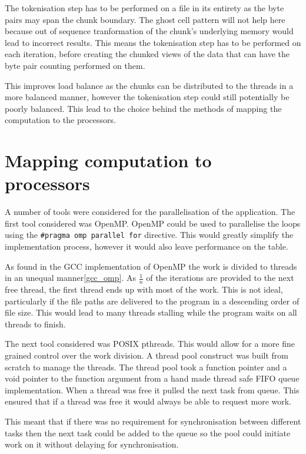 \documentclass{article}
\begin{document}
The tokenisation step has to be performed on a file in its entirety as the byte pairs may span the 
chunk boundary. The ghost cell pattern will not help here because out of sequence tranformation of the chunk's 
underlying memory would lead to incorrect results. This means the tokenisation step has to be performed on 
each iteration, before creating the chunked views of the data that can have the byte pair counting 
performed on them. 

This improves load balance as the chunks can be distributed to the threads in a more balanced manner, however the
tokenisation step could still potentially be poorly balanced. This lead to the choice behind the methods of 
mapping the computation to the processors.

\section{Mapping computation to processors}
A number of tools were considered for the parallelisation of the application. The first tool considered was OpenMP.
OpenMP could be used to parallelise the loops using the \texttt{#pragma omp parallel for} directive. 
This would greatly simplify the implementation process, however it would also leave performance on the table.

As found in the GCC implementation of OpenMP the work is divided to threads in an unequal manner\ref{gcc_omp}.
As $\frac{1}{n}$ of the iterations are provided to the next free thread, the first thread ends up with most of the work.
This is not ideal, particularly if the file paths are delivered to the program in a descending order of file size.
This would lead to many threads stalling while the program waits on all threads to finish.

The next tool considered was POSIX pthreads. This would allow for a more fine grained control over the work 
division. A thread pool construct was built from scratch to manage the threads. The thread pool took a function pointer
and a void pointer to the function argument from a hand made thread safe FIFO queue implementation. 
When a thread was free it pulled the next task from queue. This ensured that if a thread was free it would 
always be able to request more work.

This meant that if there was no requirement for synchronisation between different tasks then the next task could 
be added to the queue so the pool could initiate work on it without delaying for synchronisation.
\end{document}
